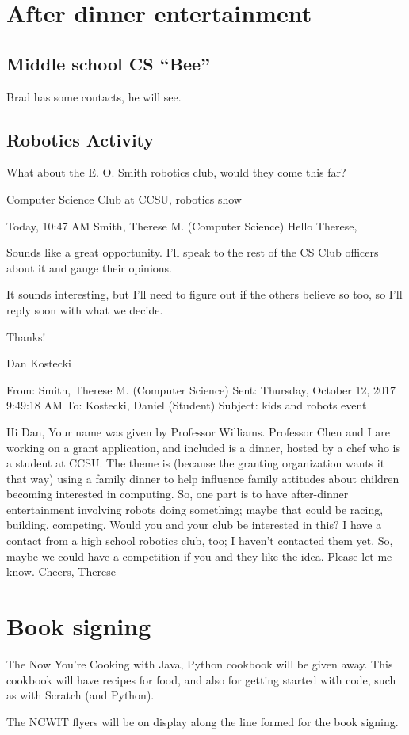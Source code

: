 \documentclass[]{article}
\begin{document}
\section{After dinner entertainment}

\subsection{Middle school CS ``Bee''}
Brad has some contacts, he will see.
\subsection{Robotics Activity}
What about the E. O. Smith robotics club, would they come this far?


Computer Science Club at CCSU, robotics show

Today, 10:47 AM
Smith, Therese M. (Computer Science) 
Hello Therese, 

Sounds like a great opportunity. I'll speak to the rest of the CS Club officers about it and gauge their opinions.

It sounds interesting, but I'll need to figure out if the others believe so too, so I'll reply soon with what we decide.

Thanks!

Dan Kostecki

From: Smith, Therese M. (Computer Science)
Sent: Thursday, October 12, 2017 9:49:18 AM
To: Kostecki, Daniel (Student)
Subject: kids and robots event

Hi Dan,
Your name was given by Professor Williams.
Professor Chen and I are working on a grant application, and included is a dinner, hosted by a chef who is a student at CCSU. The theme is (because the granting organization wants it that way) using a family dinner to help influence family attitudes about children becoming interested in computing. So, one part is to have after-dinner entertainment involving robots doing something; maybe that could be racing, building, competing. Would you and your club be interested in this? 
I have a contact from a high school robotics club, too; I haven't contacted them yet. So, maybe we could have a competition if you and they like the idea. Please let me know.
Cheers,
Therese

\section{Book signing}
The Now You're Cooking with Java, Python cookbook will be given away. This cookbook will have recipes for food, and also for getting started with code, such as with Scratch (and Python).

The NCWIT flyers will be on display along the line formed for the book signing.
\end{document}
